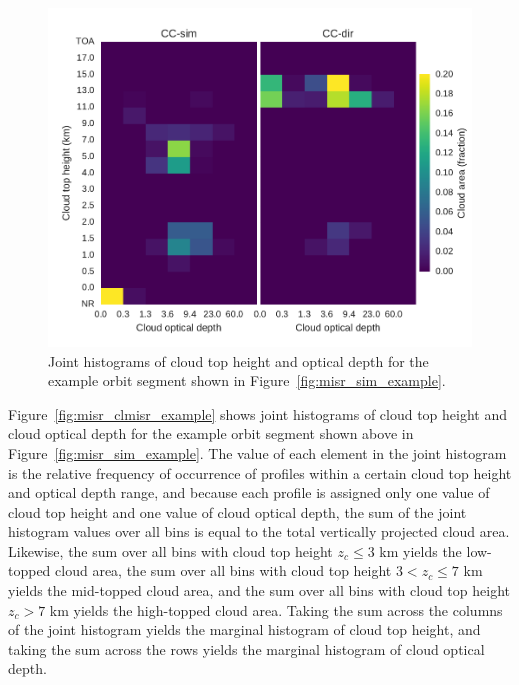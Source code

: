 \begin{figure}[htbp]
\centering
\includegraphics{graphics/misr_clmisr_example.pdf}
\caption{\label{fig:misr_clmisr_example}Joint histograms of cloud top
height and optical depth for the example orbit segment shown in
Figure~\ref{fig:misr_sim_example}.}\label{fig:misrux5fclmisrux5fexample}
\end{figure}

Figure~\ref{fig:misr_clmisr_example} shows joint histograms of cloud top
height and cloud optical depth for the example orbit segment shown above
in Figure~\ref{fig:misr_sim_example}. The value of each element in the
joint histogram is the relative frequency of occurrence of profiles
within a certain cloud top height and optical depth range, and because
each profile is assigned only one value of cloud top height and one
value of cloud optical depth, the sum of the joint histogram values over
all bins is equal to the total vertically projected cloud area.
Likewise, the sum over all bins with cloud top height \(z_c \le 3\) km
yields the low-topped cloud area, the sum over all bins with cloud top
height \(3 < z_c \le 7\) km yields the mid-topped cloud area, and the
sum over all bins with cloud top height \(z_c > 7\) km yields the
high-topped cloud area. Taking the sum across the columns of the joint
histogram yields the marginal histogram of cloud top height, and taking
the sum across the rows yields the marginal histogram of cloud optical
depth.

